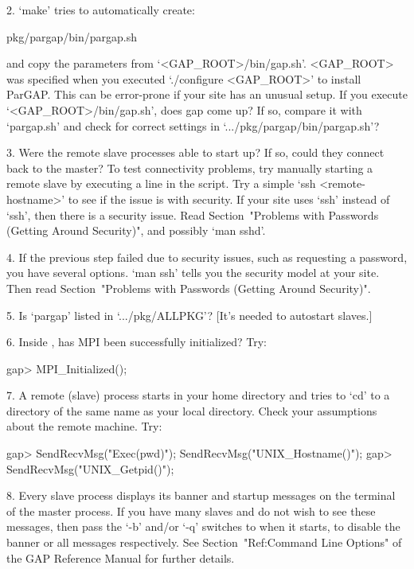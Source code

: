 \item{2.}
   `make' tries to automatically create:

\begintt
pkg/pargap/bin/pargap.sh
\endtt

\item{}
    and copy the parameters from `<GAP_ROOT>/bin/gap.sh'. <GAP_ROOT>  was
    specified when  you  executed  `./configure  <GAP_ROOT>'  to  install
    ParGAP. This can be error-prone if your site has an unusual setup. If
    you execute `<GAP_ROOT>/bin/gap.sh', does gap come up? If so, compare
    it   with   `pargap.sh'   and   check   for   correct   settings   in
    `.../pkg/pargap/bin/pargap.sh'?

\item{3.}
    Were the remote slave processes able to start up? If so,  could  they
    connect back to  the  master?  To  test  connectivity  problems,  try
    manually starting a remote slave by executing a line in  the  script.
    Try a simple `ssh <remote-hostname>' to see  if  the  issue  is  with
    security. If your site uses `ssh' instead of `ssh', then there  is  a
    security issue. Read Section~"Problems with Passwords (Getting Around
    Security)", and possibly `man sshd'.

\item{4.}
    If  the  previous  step  failed  due  to  security  issues,  such  as
    requesting a password, you have several options. `man ssh' tells  you
    the security model at your site.  Then read Section~"Problems with
    Passwords (Getting Around Security)".

\item{5.}
    Is `pargap' listed in `.../pkg/ALLPKG'?
    [It's needed to autostart slaves.]

\item{6.}
    Inside {\ParGAP}, has MPI been successfully initialized?
    Try:  
    
\beginexample
gap> MPI_Initialized();
\endexample

\item{7.}
    A remote (slave) {\ParGAP} process starts in your home directory  and
    tries to `cd'  to  a  directory  of  the  same  name  as  your  local
    directory. Check your assumptions about the remote machine. Try:

\beginexample
gap> SendRecvMsg("Exec(pwd)"); SendRecvMsg("UNIX_Hostname()");
gap> SendRecvMsg("UNIX_Getpid()");
\endexample

\item{8.}
    Every {\ParGAP} slave process displays its {\GAP} banner and startup 
    messages on the terminal of the master process. If you have many slaves
    and do not wish to see these messages, then pass the `-b' and/or `-q' 
    switches to {\ParGAP} when it starts, to disable the banner or all messages
    respectively. See Section~"Ref:Command Line Options" of the GAP Reference
    Manual for further details.

